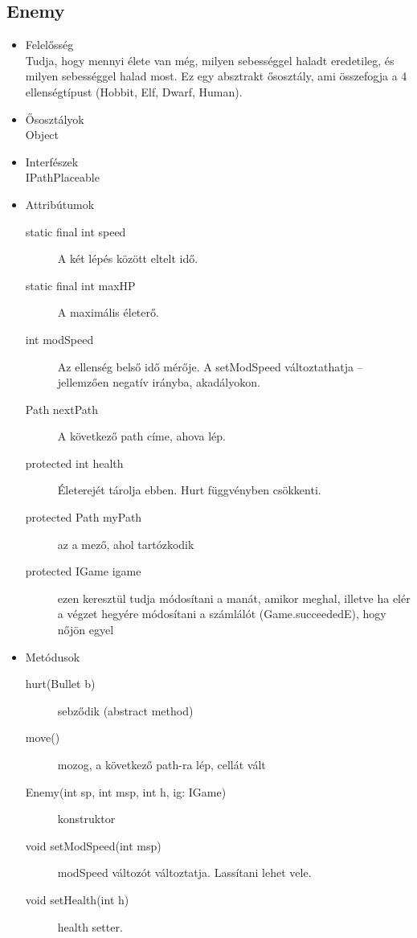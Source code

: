 \subsection{Enemy}
\begin{itemize}
\item Felelősség\\
Tudja, hogy mennyi élete van még, milyen sebességgel haladt eredetileg, és milyen sebességgel halad most. Ez egy absztrakt ősosztály, ami összefogja a 4 ellenségtípust (Hobbit, Elf, Dwarf, Human).
\item Ősosztályok\\
Object
\item Interfészek\\
IPathPlaceable
\item Attribútumok\\
	\begin{description}
		\item[static final int speed] A két lépés között eltelt idő.
		\item [static final int maxHP] A maximális életerő.
\item[int modSpeed] Az ellenség belső idő mérője. A setModSpeed változtathatja – jellemzően negatív irányba, akadályokon.
\item[Path nextPath] A következő path címe, ahova lép.
\item[protected int health] Életerejét tárolja ebben. Hurt függvényben csökkenti.
\item[protected Path myPath] az a mező, ahol tartózkodik
\item[protected IGame igame] ezen keresztül tudja módosítani a manát, amikor meghal, illetve ha elér a végzet hegyére módosítani a számlálót (Game.succeededE), hogy nőjön egyel

	\end{description}
\item Metódusok\\
	\begin{description}
		\item[hurt(Bullet b)] sebződik (abstract method)
\item[move()] mozog, a következő path-ra lép, cellát vált
\item[Enemy(int sp, int msp, int h, ig: IGame)] konstruktor
\item[void setModSpeed(int msp)] modSpeed változót változtatja. Lassítani lehet vele.
\item[void setHealth(int h)] health setter.

	\end{description}
\end{itemize}


